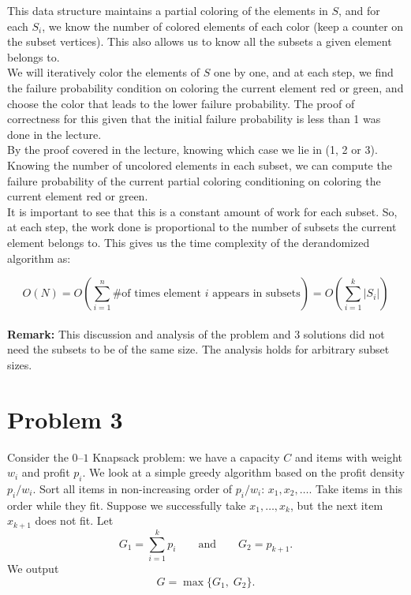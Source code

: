 \documentclass[a4paper]{article}
\begin{document}
\noindent This data structure maintains a partial coloring of the elements in $S$, and for each $S_i$, we know the number of colored elements of each color (keep a counter on the subset vertices). This also allows us to know all the subsets a given element belongs to. \\

\noindent We will iteratively color the elements of $S$ one by one, and at each step, we find the failure probability condition on coloring the current element red or green, and choose the color that leads to the lower failure probability. The proof of correctness for this given that the initial failure probability is less than 1 was done in the lecture.\\

\noindent By the proof covered in the lecture, knowing which case we lie in (1, 2 or 3). Knowing the number of uncolored elements in each subset, we can compute the failure probability of the current partial coloring conditioning on coloring the current element red or green. \\

\noindent It is important to see that this is a constant amount of work for each subset. So, at each step, the work done is proportional to the number of subsets the current element belongs to. This gives us the time complexity of the derandomized algorithm as:

\[O(N) = O\left(\sum_{i=1}^{n} \text{\# of times element } i \text{ appears in subsets}\right) = O\left(\sum_{i=1}^{k} |S_i|\right)\]\\


\noindent\textbf{Remark:} This discussion and analysis of the problem and 3 solutions did not need the subsets to be of the same size. The analysis holds for arbitrary subset sizes.


\newpage \section*{Problem 3}
Consider the $0$--$1$ Knapsack problem: we have a capacity $C$ and items with weight $w_i$ and profit $p_i$. We look at a simple greedy algorithm based on the profit density $p_i / w_i$. Sort all items in non-increasing order of $p_i / w_i$: $x_1, x_2, \ldots$. Take items in this order while they fit. Suppose we successfully take $x_1,\ldots,x_k$, but the next item $x_{k+1}$ does not fit. Let
\[
G_1 = \sum_{i=1}^k p_i \qquad \text{and} \qquad G_2 = p_{k+1}.
\]
We output
\[
G = \max\{G_1,\; G_2\}.
\]\\
\end{document}
